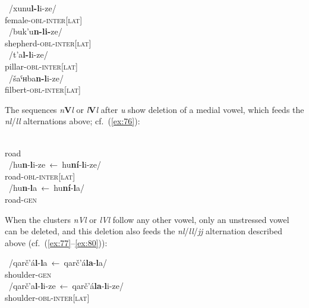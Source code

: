 \documentclass[output=paper]{langsci/langscibook}
\begin{document}
\ea \label{ex:72} %
~/{xunu\textbf{l-l}i-ze}/\\
female-\textsc{obl}-\textsc{inter}[\textsc{lat}]\\

\ex \label{ex:73} %
~/{buk'u\textbf{n-li-}ze}/\\
shepherd-\textsc{obl}-\textsc{inter}[\textsc{lat}]\\

\ex \label{ex:74} %
~/{t'a\textbf{l-l}i-ze}/\\
pillar-\textsc{obl}-\textsc{inter}[\textsc{lat}]\\

\ex \label{ex:75} %
~/{šaˤʜba\textbf{n-l}i-ze}/\\
filbert-\textsc{obl}-\textsc{inter}[\textsc{lat}]\\
\z

The sequences \emph{n}\textbf{V}\emph{l} or \emph{l}\textbf{V}\emph{l} after
\emph{u} show deletion of a medial vowel, which feeds the
\emph{nl}/\emph{ll} alternations above; cf.\ (\ref{ex:76}):

\ea \label{ex:76} %
\ea
{}\\
  road\\
  
\ex  {}~/{hu\textbf{n}-\textbf{l}i-ze~←~hu\textbf{ní}-\textbf{l}i-ze}/\\
  road-\textsc{obl}-\textsc{inter}[\textsc{lat}]\\

\ex  {}~/{hu\textbf{n}-\textbf{l}a~←~hu\textbf{ní}-\textbf{l}a}/\\
  road-\textsc{gen}\\
  \z
  \z


When the clusters \emph{n\textup{V}l} or \emph{l\textup{V}l} follow any other
vowel, only an unstressed vowel can be deleted, and this deletion also
feeds the \emph{nl}/\emph{ll}/\emph{jj} alternation described above (cf.\
(\ref{ex:77}–\ref{ex:80})):

\ea \label{ex:77} %
~/{qarč'á\textbf{l}-\textbf{l}a~←~qarč'á\textbf{la}-\textbf{l}a}/\\
shoulder-\textsc{gen}\\

\ex \label{ex:78} %
~/{qarč'a\textbf{l}-\textbf{l}i-ze~←~qarč'á\textbf{la}-\textbf{l}i-ze}/\\
shoulder-\textsc{obl}-\textsc{inter}[\textsc{lat}]\\
\end{document}
